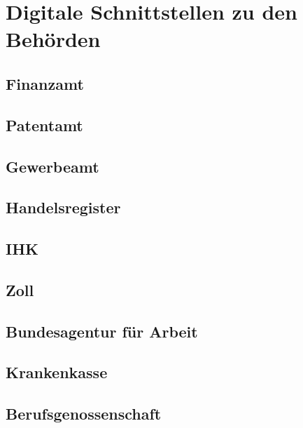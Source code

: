 
\section{Digitale Schnittstellen zu den Behörden} \label{digitaleBehoerden}

\subsection{Finanzamt} \label{finanzamt}


\subsection{Patentamt} \label{patentamt}


\subsection{Gewerbeamt} \label{gewerbeamt}


\subsection{Handelsregister} \label{handelsregister}


\subsection{IHK} \label{ihk}


\subsection{Zoll} \label{zoll}


\subsection{Bundesagentur für Arbeit} \label{bundesagenturFuerArbeit}


\subsection{Krankenkasse} \label{krankenkasse}


\subsection{Berufsgenossenschaft} \label{berufsgenossenschaft}

